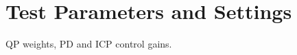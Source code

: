 %
\chapter{Test Parameters and Settings}\label{chap:params}
\ac{QP} weights, PD and \ac{ICP} control gains. 


